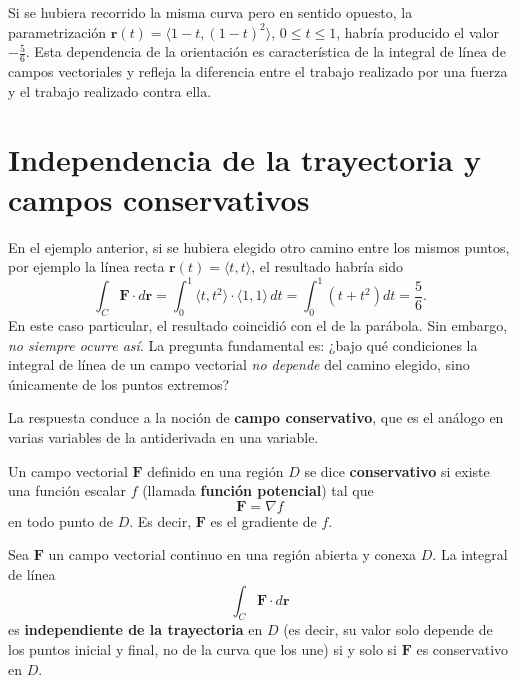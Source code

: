 \begin{rem}
Si se hubiera recorrido la misma curva pero en sentido opuesto, la
parametrización $\mathbf{r}(t)=\langle 1-t, (1-t)^2 \rangle$,
$0\le t\le 1$, habría producido el valor $-\frac{5}{6}$. Esta
dependencia de la orientación es característica de la integral de línea
de campos vectoriales y refleja la diferencia entre el trabajo realizado
por una fuerza y el trabajo realizado contra ella.
\end{rem}

\section{Independencia de la trayectoria y campos conservativos}

En el ejemplo anterior, si se hubiera elegido otro camino entre los
mismos puntos, por ejemplo la línea recta $\mathbf{r}(t)=\langle t,t
\rangle$, el resultado habría sido
\[
\int_C \mathbf{F}\cdot d\mathbf{r}
= \int_0^1 \langle t, t^2 \rangle \cdot \langle 1,1 \rangle \, dt
= \int_0^1 (t+t^2) dt = \frac{5}{6}.
\]
En este caso particular, el resultado coincidió con el de la parábola.
Sin embargo, \emph{no siempre ocurre así}. La pregunta fundamental es:
¿bajo qué condiciones la integral de línea de un campo vectorial
\emph{no depende} del camino elegido, sino únicamente de los puntos
extremos?

La respuesta conduce a la noción de \textbf{campo conservativo}, que
es el análogo en varias variables de la antiderivada en una variable.

\begin{definition}
Un campo vectorial $\mathbf{F}$ definido en una región $D$ se dice
\textbf{conservativo} si existe una función escalar $f$ (llamada
\textbf{función potencial}) tal que
\[
\mathbf{F} = \nabla f
\]
en todo punto de $D$. Es decir, $\mathbf{F}$ es el gradiente de $f$.
\end{definition}

\begin{theorem}
Sea $\mathbf{F}$ un campo vectorial continuo en una región abierta y
conexa $D$. La integral de línea
\[
\int_C \mathbf{F} \cdot d\mathbf{r}
\]
es \textbf{independiente de la trayectoria} en $D$ (es decir, su valor
solo depende de los puntos inicial y final, no de la curva que los une)
si y solo si $\mathbf{F}$ es conservativo en $D$.
\end{theorem}


